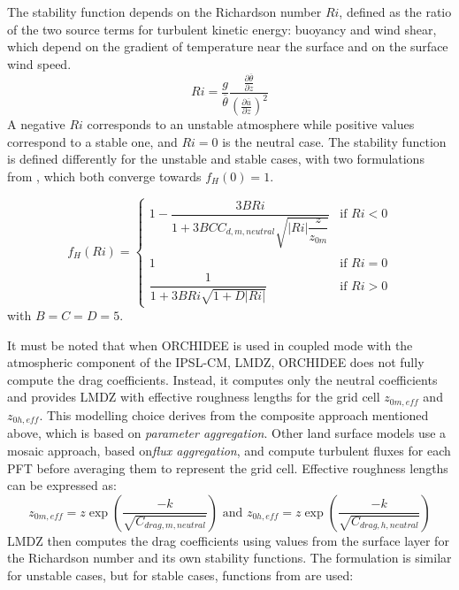 The stability function depends on the Richardson number $Ri$, defined as the ratio of the two source terms for turbulent kinetic energy: buoyancy and wind shear, which depend on the gradient of temperature near the surface and on the surface wind speed. 
\begin{equation}
Ri= \frac{g}{\overline \theta} \frac{\frac{\partial \overline \theta}{\partial z}}{(\frac{\partial \overline u}{ \partial z})^2}
\end{equation}
A negative $Ri$ corresponds to an unstable atmosphere while positive values correspond to a stable one, and $Ri=0$ is the neutral case.
The stability function is defined differently for the unstable and stable cases, with two formulations from \citet{louis_short_1982}, which both converge towards $f_H(0)=1$.

\begin{equation}
f_H(Ri) = 
\begin{cases}
1 - \dfrac{3 B Ri}{1 + 3 B C C_{d,m,neutral} \sqrt{|Ri| \dfrac{z}{z_{0m}}}} & \text{if } Ri < 0 \\
\\
1 & \text{if } Ri=0\\
\dfrac{1}{1 + 3 B Ri \sqrt{1 + D |Ri|}} & \text{if } Ri > 0
\end{cases}
\end{equation}
with $B=C=D=5$.

\hfill

It must be noted that when ORCHIDEE is used in coupled mode with the atmospheric component of the IPSL-CM, LMDZ, ORCHIDEE does not fully compute the drag coefficients.
Instead, it computes only the neutral coefficients and provides LMDZ with effective roughness lengths for the grid cell $z_{0m,eff}$ and $z_{0h,eff}$. This modelling choice derives from the composite approach mentioned above, which is based on \textit{parameter aggregation}. Other land surface models use a mosaic approach, based on\textit{flux aggregation}, and compute turbulent fluxes for each PFT before averaging them to represent the grid cell.
Effective roughness lengths can be expressed as:
\begin{equation}
    z_{0m,eff}=z \exp{\left(\frac{-k}{\sqrt{C_{drag,m,neutral}}}\right)}
     \text{ and } 
    z_{0h,eff}=z \exp{\left(\frac{-k}{\sqrt{C_{drag,h,neutral}}}\right)}
\end{equation}
LMDZ then computes the drag coefficients using values from the surface layer for the Richardson number and its own stability functions. The formulation is similar for unstable cases, but for stable cases, functions from \cite{king_sensitivity_2001} are used:

